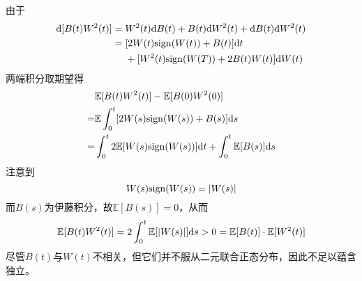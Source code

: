 \documentclass[cn]{homework}
\newcommand{\E}{\mathbb E}
\begin{document}
\begin{subproblem}
        \item
        由于
        \[\begin{aligned}
            \mathrm d[B(t)W^2(t)]&=W^2(t)\mathrm d B(t)+B(t)\mathrm d W^2(t)+\mathrm d B(t)\mathrm d W^2(t)\\
            &=\begin{aligned}[t]
                &[2W(t)\mathrm{sign}(W(t))+B(t)]\mathrm d t\\
                &+[W^2(t)\mathrm{sign}(W(T))+2B(t)W(t)]\mathrm d W(t)
            \end{aligned}\\
        \end{aligned}\]
        两端积分取期望得
        \[\begin{aligned}
            &\E[B(t)W^2(t)]-\E[B(0)W^2(0)]\\
            =&\E\int_0^t[2W(s)\sgn(W(s))+B(s)]\diff s\\
            =&\int_0^t2\E[W(s)\sgn(W(s))]\diff t+\int_0^t\E[B(s)]\diff s
        \end{aligned}\]
        注意到
        \[W(s)\mathrm{sign}(W(s))=|W(s)|\]
        而$B(s)$为伊藤积分，故$\E[B(s)]=0$，从而
        \[\E[B(t)W^2(t)]=2\int_0^t\E[|W(s)|]\diff s>0=\E[B(t)]\cdot\E[W^2(t)]\]
        尽管$B(t)$与$W(t)$不相关，但它们并不服从二元联合正态分布，因此不足以蕴含独立。
    \end{subproblem}
\end{document}
